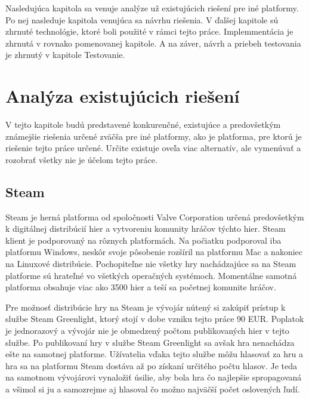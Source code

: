 Nasledujúca kapitola sa venuje analýze už existujúcich riešení pre iné platformy. Po nej nasleduje kapitola venujúca sa návrhu riešenia. V ďalšej kapitole sú zhrnuté technológie, ktoré boli použité v rámci tejto práce. Implemmentácia je zhrnutá v rovnako pomenovanej kapitole. A na záver, návrh a priebeh testovania je zhrnutý v kapitole Testovanie.

\chapter{Analýza existujúcich riešení}
\label{chap:analyza}
V tejto kapitole budú predstavené konkurenčné, existujúce a predovšetkým známejšie riešenia určené zväčša pre iné platformy, ako je platforma, pre ktorú je riešenie tejto práce určené. Určite existuje oveľa viac alternatív, ale vymenúvať a rozobrať všetky nie je účelom tejto práce.

\section{Steam}
Steam je herná platforma od spoločnosti Valve Corporation určená predovšetkým k digitálnej distribúcií hier a vytvoreniu komunity hráčov týchto hier. Steam klient je podporovaný na rôznych platformách. Na počiatku podporoval iba platformu Windows, neskôr svoje pôsobenie rozšíril na platformu Mac a nakoniec na Linuxové distribúcie. Pochopiteľne nie všetky hry nachádzajúce sa na Steam platforme sú hrateľné vo všetkých operačných systémoch. Momentálne samotná platforma obsahuje viac ako 3500 hier a teší sa početnej komunite hráčov. \cite{steam}

Pre možnosť distribúcie hry na Steam je vývojár nútený si zakúpiť prístup k službe Steam Greenlight, ktorý stojí v dobe vzniku tejto práce 90 EUR. Poplatok je jednorazový a vývojár nie je obmedzený počtom publikovaných hier v tejto službe. Po publikovaní hry v službe Steam Greenlight sa avšak hra nenachádza ešte na samotnej platforme. Užívatelia vďaka tejto službe môžu hlasovať za hru a hra sa na platformu Steam dostáva až po získaní určitého počtu hlasov. Je teda na samotnom vývojárovi vynaložiť úsilie, aby bola hra čo najlepšie spropagovaná a všimol si ju a samozrejme aj hlasoval čo možno najväčší počet oslovených ľudí. \cite{steam-greenlight}

